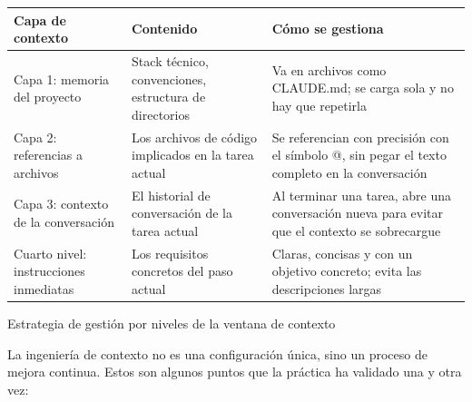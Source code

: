 \begin{center}
\begin{tabularx}{\linewidth}{|X|X|X|}
\hline
\textbf{Capa de contexto} & \textbf{Contenido} & \textbf{Cómo se gestiona} \tabularnewline
\hline
Capa 1: memoria del proyecto & Stack técnico, convenciones, estructura de directorios & Va en archivos como CLAUDE.md; se carga sola y no hay que repetirla \tabularnewline
Capa 2: referencias a archivos & Los archivos de código implicados en la tarea actual & Se referencian con precisión con el símbolo @, sin pegar el texto completo en la conversación \tabularnewline
Capa 3: contexto de la conversación & El historial de conversación de la tarea actual & Al terminar una tarea, abre una conversación nueva para evitar que el contexto se sobrecargue \tabularnewline
Cuarto nivel: instrucciones inmediatas & Los requisitos concretos del paso actual & Claras, concisas y con un objetivo concreto; evita las descripciones largas \tabularnewline
\hline
\end{tabularx}
\end{center}

\begin{center}\small\color{gray}Estrategia de gestión por niveles de la ventana de contexto\end{center}


La ingeniería de contexto no es una configuración única, sino un proceso de mejora continua. Estos son algunos puntos que la práctica ha validado una y otra vez:

